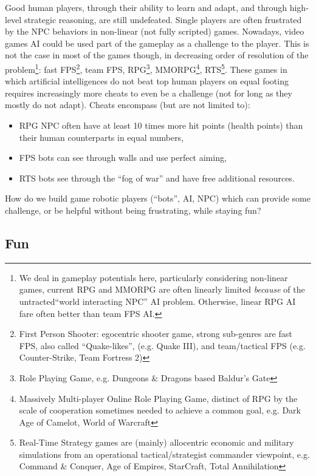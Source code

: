 Good human players, through their ability to learn and adapt, and through high-level strategic reasoning, are still undefeated. Single players are often frustrated by the NPC behaviors in non-linear (not fully scripted) games. Nowadays, video games AI could be used part of the gameplay as a challenge to the player. 
This is not the case in most of the games though, in decreasing order of resolution of the problem\footnote{We deal in gameplay potentials here, particularly considering non-linear games, current RPG and MMORPG are often linearly limited \textit{because} of the untracted``world interacting NPC'' AI problem. Otherwise, linear RPG AI fare often better than team FPS AI.}: fast FPS\footnote{First Person Shooter: egocentric shooter game, strong sub-genres are fast FPS, also called ``Quake-likes'', (e.g. Quake III), and team/tactical FPS (e.g. Counter-Strike, Team Fortress 2)}, team FPS, RPG\footnote{Role Playing Game, e.g. Dungeons \& Dragons based Baldur's Gate}, MMORPG\footnote{Massively Multi-player Online Role Playing Game, distinct of RPG by the scale of cooperation sometimes needed to achieve a common goal, e.g. Dark Age of Camelot, World of Warcraft}, RTS\footnote{Real-Time Strategy games are (mainly) allocentric economic and military simulations from an operational tactical/strategist commander viewpoint, e.g. Command \& Conquer, Age of Empires, StarCraft, Total Annihilation}. These games in which artificial intelligences do not beat top human players on equal footing requires increasingly more cheats to even be a challenge (not for long as they mostly do not adapt). Cheats encompass (but are not limited to):
\begin{itemize}
\item RPG NPC often have at least 10 times more hit points (health points) than their human counterparts in equal numbers,
\item FPS bots can see through walls and use perfect aiming,
\item RTS bots see through the ``fog of war'' and have free additional resources.
\end{itemize}
How do we build game robotic players (``bots'', AI, NPC) which can provide some challenge, or be helpful without being frustrating, while staying fun?


\subsection{Fun}



